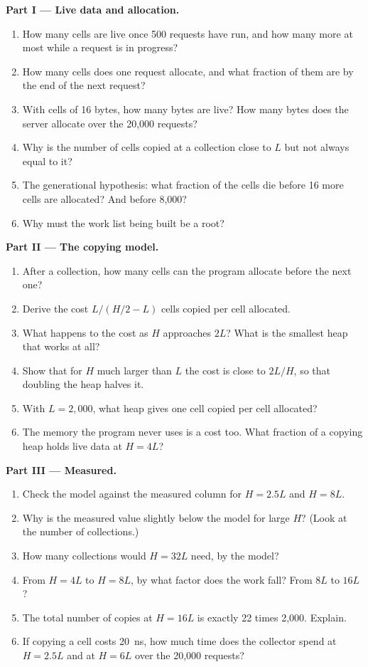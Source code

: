 \begin{problem}
\medskip\noindent\textbf{Part I --- Live data and allocation.}
\begin{enumerate}
\item How many cells are live once 500 requests have run, and how many more at most while a request is in progress?
\item How many cells does one request allocate, and what fraction of them are  by the end of the next request?
\item With cells of 16 bytes, how many bytes are live? How many bytes does the server allocate over the 20,000 requests?
\item Why is the number of cells copied at a collection close to $L$ but not always equal to it?
\item The generational hypothesis: what fraction of the cells die before 16 more cells are allocated? And before 8,000?
\item Why must the work list being built be a root?
\end{enumerate}

\medskip\noindent\textbf{Part II --- The copying model.}
\begin{enumerate}[resume]
\item After a collection, how many cells can the program allocate before the next one?
\item Derive the cost $L/(H/2 - L)$ cells copied per cell allocated.
\item What happens to the cost as $H$ approaches $2L$? What is the smallest heap that works at all?
\item Show that for $H$ much larger than $L$ the cost is close to $2L/H$, so that doubling the heap halves it.
\item With $L = 2{,}000$, what heap gives one cell copied per cell allocated?
\item The memory the program never uses is a cost too. What fraction of a copying heap holds live data at $H = 4L$?
\end{enumerate}

\medskip\noindent\textbf{Part III --- Measured.}
\begin{enumerate}[resume]
\item Check the model against the measured column for $H = 2.5L$ and $H = 8L$.
\item Why is the measured value slightly below the model for large $H$? (Look at the number of collections.)
\item How many collections would $H = 32L$ need, by the model?
\item From $H = 4L$ to $H = 8L$, by what factor does the work fall? From $8L$ to $16L$?
\item The total number of copies at $H = 16L$ is exactly 22 times 2,000. Explain.
\item If copying a cell costs 20~ns, how much time does the collector spend at $H = 2.5L$ and at $H = 6L$ over the 20,000 requests?
\end{enumerate}


\end{problem}
